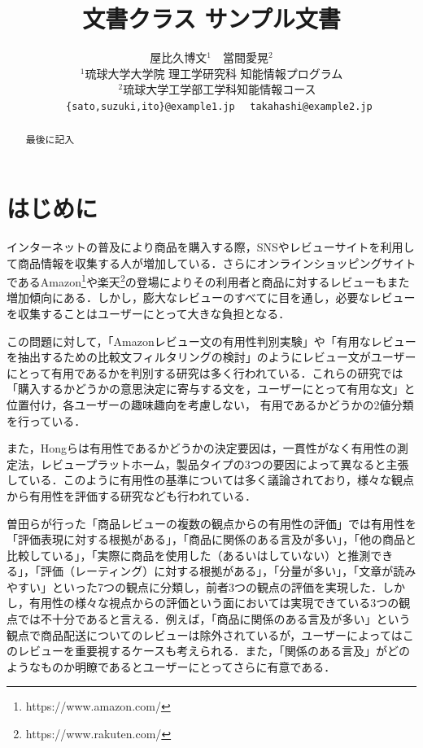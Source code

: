 \documentclass[
  platex, dvipdfmx,  %
]{nlp2024}
\title{\pkg{NLP2024}文書クラス サンプル文書}
\author{%
  屋比久博文${}^{1}$　當間愛晃${}^{2}$　\\
${}^{1}$琉球大学大学院 理工学研究科 知能情報プログラム\\
　${}^{2}$琉球大学工学部工学科知能情報コース\\
　 \texttt{\{sato,suzuki,ito\}@example1.jp}
　\texttt{takahashi@example2.jp}\\}
\begin{document}
\maketitle
\begin{abstract}
最後に記入
\end{abstract}

\section{はじめに}
インターネットの普及により商品を購入する際，SNSやレビューサイトを利用して商品情報を収集する人が増加している．さらにオンラインショッピングサイトであるAmazon\footnote{https://www.amazon.com/}や楽天\footnote{https://www.rakuten.com/}の登場によりその利用者と商品に対するレビューもまた増加傾向にある．しかし，膨大なレビューのすべてに目を通し，必要なレビューを収集することはユーザーにとって大きな負担となる．

この問題に対して，「Amazonレビュー文の有用性判別実験\cite{Article_02}」や「有用なレビューを抽出するための比較文フィルタリングの検討\cite{Article_03}」のようにレビュー文がユーザーにとって有用であるかを判別する研究は多く行われている．これらの研究では「購入するかどうかの意思決定に寄与する文を，ユーザーにとって有用な文」と位置付け，各ユーザーの趣味趣向を考慮しない，
有用であるかどうかの2値分類を行っている．

また，Hongらは有用性であるかどうかの決定要因は，一貫性がなく有用性の測定法，レビュープラットホーム，製品タイプの3つの要因によって異なると主張している\cite{Article_04}．このように有用性の基準については多く議論されており，様々な観点から有用性を評価する研究なども行われている．

曽田らが行った「商品レビューの複数の観点からの有用性の評価\cite{Article_05}」では有用性を「評価表現に対する根拠がある」，「商品に関係のある言及が多い」，「他の商品と比較している」，「実際に商品を使用した（あるいはしていない）と推測できる」，「評価（レーティング）に対する根拠がある」，「分量が多い」，「文章が読みやすい」といった7つの観点に分類し，前者3つの観点の評価を実現した．しかし，有用性の様々な視点からの評価という面においては実現できている3つの観点では不十分であると言える．例えば，「商品に関係のある言及が多い」という観点で商品配送についてのレビューは除外されているが，ユーザーによってはこのレビューを重要視するケースも考えられる．また，「関係のある言及」がどのようなものか明瞭であるとユーザーにとってさらに有意である．
\end{document}
